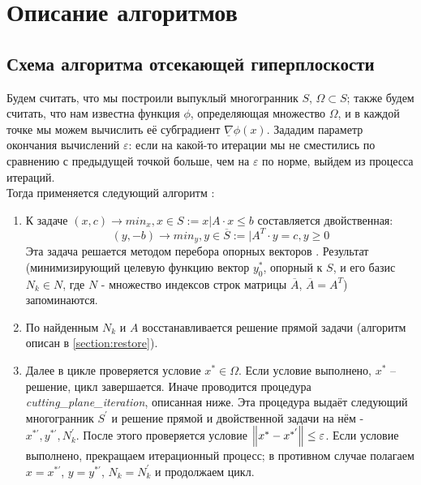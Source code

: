 \documentclass[main.tex]{subfiles}
\begin{document}
\newpage
\section{Описание алгоритмов}
\subsection{Схема алгоритма отсекающей гиперплоскости}
Будем считать, что мы построили выпуклый многогранник $S$, $\varOmega \subset S$; также будем считать, что нам известна функция $\phi$, определяющая множество $\varOmega$, и в каждой точке мы можем вычислить её субградиент $\underline{\nabla}\phi(x)$. Зададим параметр окончания вычислений $\varepsilon$: если на какой-то итерации мы не сместились  по сравнению с предыдущей точкой больше, чем на $\varepsilon$ по норме, выйдем из процесса итераций.\\
Тогда применяется следующий алгоритм \cite{boldirev}:
\begin{enumerate}
	\item К задаче $(x,c) \rightarrow min_x, x \in S:={x|A\cdot x\le b}$ составляется двойственная: 
	$$(y,-b) \rightarrow min_y, y \in \overline{S}:={|A^T\cdot y = c, y \ge 0}$$
	Эта задача решается методом перебора опорных векторов \cite{petuh}. Результат (минимизирующий целевую функцию вектор $y^*_0$, опорный к $S$, и его базис $N_k \in N$, где $N$ - множество индексов строк матрицы $\overline{A}$, $\overline{A} = A^T$) запоминаются. 
	\item По найденным $N_k$ и $A$ восстанавливается решение прямой задачи (алгоритм описан в \ref{section:restore}).
	\item Далее в цикле проверяется условие $x^* \in \varOmega$. Если условие выполнено, $x^*$ -- решение, цикл завершается. Иначе проводится процедура \emph{cutting\_plane\_iteration}, описанная ниже. Эта процедура выдаёт следующий многогранник $S^{'}$ и решение прямой и двойственной задачи на нём - $x^{*'}, y^{*'}, N_k^{'}$. После этого проверяется условие $\left\lVert x^*-x^{*'}\right\rVert \le \varepsilon$. Если условие выполнено, прекращаем итерационный процесс; в противном случае полагаем $x=x^{*'}$, $y=y^{*'}$, $N_k=N_k^{'}$ и продолжаем цикл.
\end{enumerate}
\end{document}

